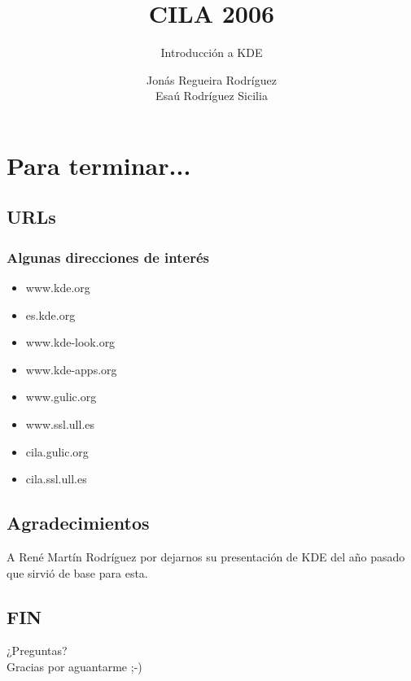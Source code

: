 \documentclass{beamer}
\title{CILA 2006}
\subtitle{Introducción a KDE}
\author[Jonás Regueira Rodríguez y Esaú Rodríguez Sicilia]{
	Jonás Regueira Rodríguez \\
	Esaú Rodríguez Sicilia
}
\begin{document}
\begin{frame}
  \titlepage
\end{frame}







\section{Para terminar...}
\subsection{URLs}
\frame
{
	\frametitle{Algunas direcciones de interés}
	\begin{itemize}
		\item<1->{www.kde.org}
		\item<2->{es.kde.org}
		\item<3->{www.kde-look.org}
		\item<4->{www.kde-apps.org}
		\item<5->{www.gulic.org}
		\item<6->{www.ssl.ull.es}
		\item<7->{cila.gulic.org}
		\item<8->{cila.ssl.ull.es}
	\end{itemize}
}
\subsection{Agradecimientos}
\frame
{
	\begin{center}
	A René Martín Rodríguez por dejarnos su presentación de KDE del año pasado que sirvió de base para esta.
	\end{center}
}
\subsection{FIN}
\frame
{
	\begin{center}
		\huge{¿Preguntas?}\\
		\pause
		\huge{Gracias por aguantarme ;-)}
	\end{center}
}
\end{document}

